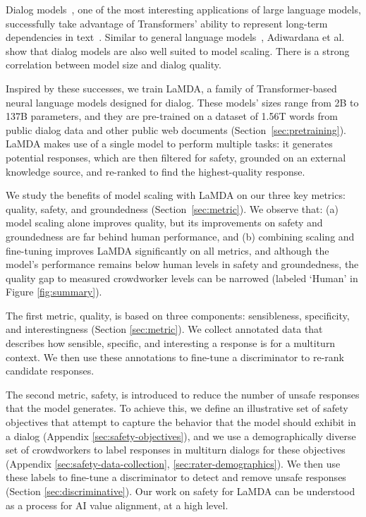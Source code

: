 Dialog models~\cite{shang-etal-2015-neural,sordoni2015neural,NCM}, one of the most interesting applications of large language models, successfully take advantage of Transformers' ability to represent long-term dependencies in text~\cite{adiwardana2020humanlike,blenderbot}. Similar to general language models~\cite{Kaplan2020ScalingLF}, Adiwardana et al.~\cite{adiwardana2020humanlike} show that dialog models are also well suited to model scaling. There is a strong correlation between model size and dialog quality.

Inspired by these successes, we train LaMDA, a family of Transformer-based neural language models designed for dialog. These models’ sizes range from 2B to 137B parameters, and they are pre-trained on a dataset of 1.56T words from public dialog data and other public web documents (Section~\ref{sec:pretraining}). LaMDA makes use of a single model to perform multiple tasks: it generates potential responses, which are then filtered for safety, grounded on an external knowledge source, and re-ranked to find the highest-quality response.

We study the benefits of model scaling with LaMDA on our three key metrics: quality, safety, and groundedness (Section~\ref{sec:metric}). We observe that: (a) model scaling alone improves quality, but its improvements on safety and groundedness are far behind human performance, and (b) combining scaling and fine-tuning improves LaMDA significantly on all metrics, and although the model’s performance remains below human levels in safety and groundedness, the quality gap to measured crowdworker levels can be narrowed (labeled `Human' in Figure \ref{fig:summary}).

The first metric, quality, is based on three components: sensibleness, specificity, and interestingness (Section \ref{sec:metric}). We collect annotated data that describes how sensible, specific, and interesting a response is for a multiturn context. We then use these annotations to fine-tune a discriminator to re-rank candidate responses.

The second metric, safety, is introduced to reduce the number of unsafe responses that the model generates. To achieve this, we define an illustrative set of safety objectives that attempt to capture the behavior that the model should exhibit in a dialog (Appendix \ref{sec:safety-objectives}), and we use a demographically diverse set of crowdworkers to label responses in multiturn dialogs for these objectives (Appendix \ref{sec:safety-data-collection}, \ref{sec:rater-demographics}). We then use these labels to fine-tune a discriminator to detect and remove unsafe responses (Section \ref{sec:discriminative}). Our work on safety for LaMDA can be understood as a process for AI value alignment, at a high level.

